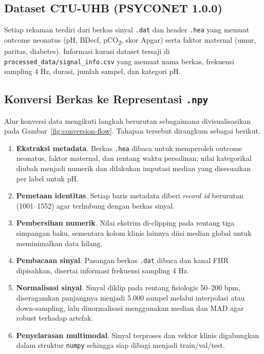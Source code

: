 \documentclass[12pt,a4paper]{article}
\begin{document}
\subsection{Dataset CTU-UHB (PSYCONET 1.0.0)}
Setiap rekaman terdiri dari berkas sinyal \texttt{.dat} dan header \texttt{.hea} yang memuat outcome neonatus (pH, BDecf, pCO\textsubscript{2}, skor Apgar) serta faktor maternal (umur, paritas, diabetes). Informasi kurasi dataset tersaji di \texttt{processed\_data/signal\_info.csv} yang memuat nama berkas, frekuensi sampling 4 Hz, durasi, jumlah sampel, dan kategori pH.

\subsection{Konversi Berkas ke Representasi \texttt{.npy}}
Alur konversi data mengikuti langkah berurutan sebagaimana divisualisasikan pada Gambar~\ref{fig:conversion-flow}. Tahapan tersebut dirangkum sebagai berikut.
\begin{enumerate}[label=\arabic*)]
    \item \textbf{Ekstraksi metadata}. Berkas \texttt{.hea} dibaca untuk memperoleh outcome neonatus, faktor maternal, dan rentang waktu persalinan; nilai kategorikal diubah menjadi numerik dan dilakukan imputasi median yang disesuaikan per label untuk pH.
    \item \textbf{Pemetaan identitas}. Setiap baris metadata diberi \textit{record id} berurutan (1001--1552) agar terhubung dengan berkas sinyal.
    \item \textbf{Pembersihan numerik}. Nilai ekstrim di-clipping pada rentang tiga simpangan baku, sementara kolom klinis lainnya diisi median global untuk meminimalkan data hilang.
    \item \textbf{Pembacaan sinyal}. Pasangan berkas \texttt{.dat} dibaca dan kanal FHR dipisahkan, disertai informasi frekuensi sampling 4 Hz.
    \item \textbf{Normalisasi sinyal}. Sinyal diklip pada rentang fisiologis 50--200 bpm, diseragamkan panjangnya menjadi 5.000 sampel melalui interpolasi atau down-sampling, lalu dinormalisasi menggunakan median dan MAD agar robust terhadap artefak.
    \item \textbf{Penyelarasan multimodal}. Sinyal terproses dan vektor klinis digabungkan dalam struktur \texttt{numpy} sehingga siap dibagi menjadi train/val/test.
\end{enumerate}
\end{document}

